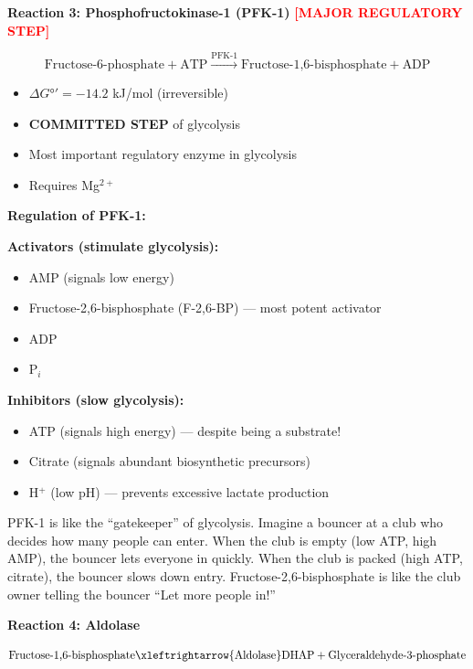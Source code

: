 \textbf{Reaction 3: Phosphofructokinase-1 (PFK-1)} \textcolor{red}{\textbf{[MAJOR REGULATORY STEP]}}

\[
\text{Fructose-6-phosphate} + \text{ATP} \xrightarrow{\text{PFK-1}} \text{Fructose-1,6-bisphosphate} + \text{ADP}
\]

\begin{itemize}
    \item $\Delta G°' = -14.2$ kJ/mol (irreversible)
    \item \textbf{COMMITTED STEP} of glycolysis
    \item Most important regulatory enzyme in glycolysis
    \item Requires Mg$^{2+}$
\end{itemize}

\begin{theorem}
\textbf{Regulation of PFK-1:}

\textbf{Activators (stimulate glycolysis):}
\begin{itemize}
    \item AMP (signals low energy)
    \item Fructose-2,6-bisphosphate (F-2,6-BP) — most potent activator
    \item ADP
    \item P$_i$
\end{itemize}

\textbf{Inhibitors (slow glycolysis):}
\begin{itemize}
    \item ATP (signals high energy) — despite being a substrate!
    \item Citrate (signals abundant biosynthetic precursors)
    \item H$^+$ (low pH) — prevents excessive lactate production
\end{itemize}
\end{theorem}

\begin{analogy}
PFK-1 is like the ``gatekeeper'' of glycolysis. Imagine a bouncer at a club who decides how many people can enter. When the club is empty (low ATP, high AMP), the bouncer lets everyone in quickly. When the club is packed (high ATP, citrate), the bouncer slows down entry. Fructose-2,6-bisphosphate is like the club owner telling the bouncer ``Let more people in!''
\end{analogy}

\textbf{Reaction 4: Aldolase}

\[
\text{Fructose-1,6-bisphosphate} \xleftrightarrow{\text{Aldolase}} \text{DHAP} + \text{Glyceraldehyde-3-phosphate}
\]

